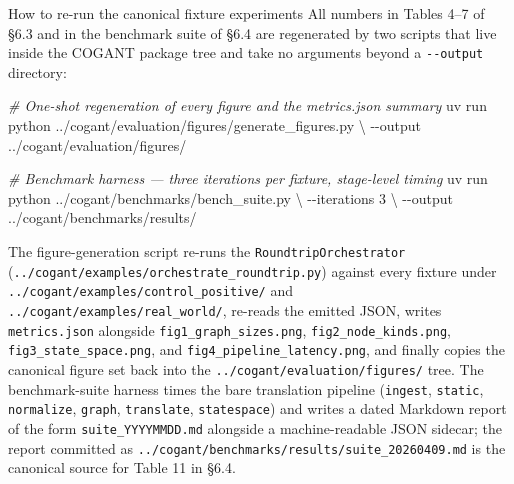\documentclass[
  ignorenonframetext,
]{beamer}
\newenvironment{Shaded}{}{}
\newcommand{\AttributeTok}[1]{\textcolor[rgb]{0.49,0.56,0.16}{#1}}
\newcommand{\CommentTok}[1]{\textcolor[rgb]{0.38,0.63,0.69}{\textit{#1}}}
\newcommand{\DataTypeTok}[1]{\textcolor[rgb]{0.56,0.13,0.00}{#1}}
\newcommand{\ExtensionTok}[1]{#1}
\newcommand{\NormalTok}[1]{#1}
\begin{document}
\begin{frame}[fragile]{How to re-run the canonical fixture experiments}
\protect{}\label{how-to-re-run-the-canonical-fixture-experiments}
All numbers in Tables 4--7 of §6.3 and in the benchmark suite of §6.4
are regenerated by two scripts that live inside the COGANT package tree
and take no arguments beyond a \texttt{-\/-output} directory:

\begin{Shaded}
\begin{Highlighting}[]
\CommentTok{\# One{-}shot regeneration of every figure and the metrics.json summary}
\ExtensionTok{uv}\NormalTok{ run python ../cogant/evaluation/figures/generate\_figures.py }\DataTypeTok{\textbackslash{}}
    \AttributeTok{{-}{-}output}\NormalTok{ ../cogant/evaluation/figures/}
\end{Highlighting}
\end{Shaded}

\begin{Shaded}
\begin{Highlighting}[]
\CommentTok{\# Benchmark harness — three iterations per fixture, stage{-}level timing}
\ExtensionTok{uv}\NormalTok{ run python ../cogant/benchmarks/bench\_suite.py }\DataTypeTok{\textbackslash{}}
    \AttributeTok{{-}{-}iterations}\NormalTok{ 3 }\DataTypeTok{\textbackslash{}}
    \AttributeTok{{-}{-}output}\NormalTok{ ../cogant/benchmarks/results/}
\end{Highlighting}
\end{Shaded}

The figure-generation script re-runs the \texttt{RoundtripOrchestrator}
(\texttt{../cogant/examples/orchestrate\_roundtrip.py}) against every
fixture under \texttt{../cogant/examples/control\_positive/} and
\texttt{../cogant/examples/real\_world/}, re-reads the emitted JSON,
writes \texttt{metrics.json} alongside \texttt{fig1\_graph\_sizes.png},
\texttt{fig2\_node\_kinds.png}, \texttt{fig3\_state\_space.png}, and
\texttt{fig4\_pipeline\_latency.png}, and finally copies the canonical
figure set back into the \texttt{../cogant/evaluation/figures/} tree.
The benchmark-suite harness times the bare translation pipeline
(\texttt{ingest}, \texttt{static}, \texttt{normalize}, \texttt{graph},
\texttt{translate}, \texttt{statespace}) and writes a dated Markdown
report of the form \texttt{suite\_YYYYMMDD.md} alongside a
machine-readable JSON sidecar; the report committed as
\texttt{../cogant/benchmarks/results/suite\_20260409.md} is the
canonical source for Table 11 in §6.4.
\end{frame}
\end{document}
